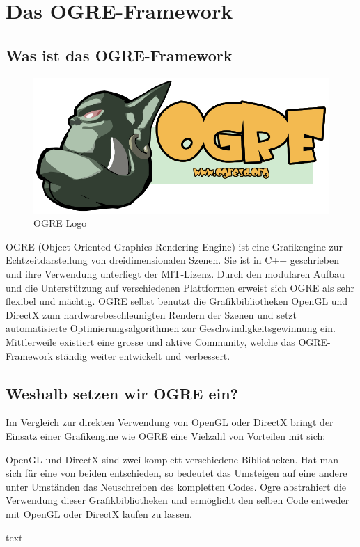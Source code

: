 \section{Das OGRE-Framework}

\subsection{Was ist das OGRE-Framework}

\begin{figure}
	\includegraphics[width=1\linewidth]{src/OgreLogo.png}
	\caption{OGRE Logo} %
	\label{OGRE Logo} %
\end{figure}

OGRE (Object-Oriented Graphics Rendering Engine) ist eine Grafikengine zur Echtzeitdarstellung von dreidimensionalen Szenen. Sie ist in C++ geschrieben und ihre Verwendung unterliegt der MIT-Lizenz. Durch den modularen Aufbau und die Unterstützung auf verschiedenen Plattformen erweist sich OGRE als sehr flexibel und mächtig. OGRE selbst benutzt die Grafikbibliotheken OpenGL und DirectX zum hardwarebeschleunigten Rendern der Szenen und setzt automatisierte Optimierungsalgorithmen zur Geschwindigkeitsgewinnung ein. Mittlerweile existiert eine grosse und aktive Community, welche das OGRE-Framework ständig weiter entwickelt und verbessert.

\subsection{Weshalb setzen wir OGRE ein?}

Im Vergleich zur direkten Verwendung von OpenGL oder DirectX bringt der Einsatz einer Grafikengine wie OGRE eine Vielzahl von Vorteilen mit sich:

 OpenGL und DirectX sind zwei komplett verschiedene Bibliotheken. Hat man sich für eine von beiden entschieden, so bedeutet das Umsteigen auf eine andere unter Umständen das Neuschreiben des kompletten Codes. Ogre abstrahiert die Verwendung dieser Grafikbibliotheken und ermöglicht den selben Code entweder mit OpenGL oder DirectX laufen zu lassen.

 text
